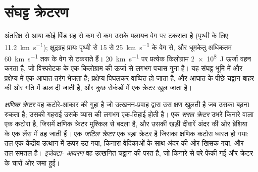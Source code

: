 \section{संघट्ट क्रेटरण}\label{sec:b3:planetary-interiors-surfaces:impacts}

अंतरिक्ष से आया कोई पिंड ग्रह से कम से कम उसके पलायन वेग पर टकराता है
(पृथ्वी के लिए \qty{11.2}{km.s^{-1}}); क्षुद्रग्रह प्रायः पृथ्वी से
15 से \qty{25}{km.s^{-1}} के वेग से, और धूमकेतु अधिकतम
\qty{60}{km.s^{-1}} तक के वेग से टकराते हैं। \qty{20}{km.s^{-1}} पर प्रत्येक किलोग्राम
\qty{2e8}{J} ऊर्जा वहन करता है, जो विस्फोटक के एक किलोग्राम की ऊर्जा से लगभग पचास गुना है।
यह संघट्ट भूमि में और प्रक्षेप्य में एक आघात-तरंग भेजता है;
प्रक्षेप्य पिघलकर वाष्पित हो जाता है, और आघात के पीछे चट्टान बाहर की ओर
गति में डाल दी जाती है, और कुछ सेकंडों में एक क्रेटर खुल जाता है।

\begin{definition}\label{def:b3:planetary-interiors-surfaces:crater-morphology}
\emph{क्षणिक क्रेटर} वह कटोरे-आकार की गुहा है
जो उत्खनन-प्रवाह द्वारा उस क्षण खुलती है जब उसका बढ़ना रुकता है; उसकी गहराई
उसके व्यास की लगभग एक-तिहाई होती है। एक \emph{सरल
क्रेटर} उभरे किनारे वाला एक कटोरा है, जिसमें क्षणिक
क्रेटर मुश्किल से बदला है, और उसकी खड़ी दीवारें अंदर की ओर ब्रेशिया के एक लेंस में ढह जाती हैं।
एक \emph{जटिल क्रेटर} एक बड़ा क्रेटर है
जिसका क्षणिक कटोरा ध्वस्त हो गया: तल एक केंद्रीय उत्थान में ऊपर उठ गया, किनारा
वेदिकाओं के साथ अंदर की ओर खिसक गया, और तल समतल है। \emph{इजेक्टा-
आवरण} वह उत्खनित चट्टान की परत है, जो किनारे से परे
फेंकी गई और क्रेटर के चारों ओर जमा हुई।
\end{definition}

